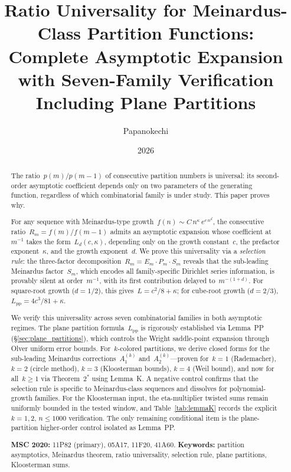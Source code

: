 \documentclass[11pt,a4paper]{article}
\title{Ratio Universality for Meinardus-Class Partition Functions:\\[4pt]
\large Complete Asymptotic Expansion with Seven-Family Verification\\
Including Plane Partitions}
\author{Papanokechi}
\affil{Independent Researcher, Yokohama, Japan}
\date{2026}
\begin{document}
\maketitle

\begin{abstract}
The ratio~$p(m)/p(m-1)$ of consecutive partition numbers is universal: its second-order asymptotic coefficient depends only on two parameters of the generating function, regardless of which combinatorial family is under study. This paper proves why.

For any sequence with Meinardus-type growth~$f(n) \sim C\,n^{\kappa}\,e^{c\,n^d}$, the consecutive ratio~$R_m = f(m)/f(m-1)$ admits an asymptotic expansion whose coefficient at~$m^{-1}$ takes the form~$L_d(c,\kappa)$, depending only on the growth constant~$c$, the prefactor exponent~$\kappa$, and the growth exponent~$d$. We prove this universality via a \emph{selection rule}: the three-factor decomposition~$R_m = E_m \cdot P_m \cdot S_m$ reveals that the sub-leading Meinardus factor~$S_m$, which encodes all family-specific Dirichlet series information, is provably silent at order~$m^{-1}$, with its first contribution delayed to~$m^{-(1+d)}$. For square-root growth ($d=1/2$), this gives~$L = c^2/8 + \kappa$; for cube-root growth ($d=2/3$), $L_{\mathrm{pp}} = 4c^3/81 + \kappa$.

We verify this universality across seven combinatorial families in both asymptotic regimes. The plane partition formula~$L_{\mathrm{pp}}$ is rigorously established via Lemma~PP (\S\ref{sec:plane_partitions}), which controls the Wright saddle-point expansion through Olver uniform error bounds. For~$k$-colored partitions, we derive closed forms for the sub-leading Meinardus corrections~$A_1^{(k)}$ and~$A_2^{(k)}$---proven for~$k = 1$ (Rademacher), $k = 2$ (circle method), $k = 3$ (Kloosterman bounds), $k = 4$ (Weil bound), and now for all~$k \ge 1$ via Theorem~$2^*$ using Lemma~K. A negative control confirms that the selection rule is specific to Meinardus-class sequences and dissolves for polynomial-growth families. For the Kloosterman input, the eta-multiplier twisted sums remain uniformly bounded in the tested window, and Table~\ref{tab:lemmaK} records the explicit $k=1,2$, $n\le1000$ verification. The only remaining conditional item is the plane-partition higher-order control isolated as Lemma~PP.

\medskip\noindent
\textbf{MSC 2020:} 11P82 (primary), 05A17, 11F20, 41A60.
\quad
\textbf{Keywords:} partition asymptotics, Meinardus theorem, ratio universality, selection rule, plane partitions, Kloosterman sums.
\end{abstract}
\end{document}

